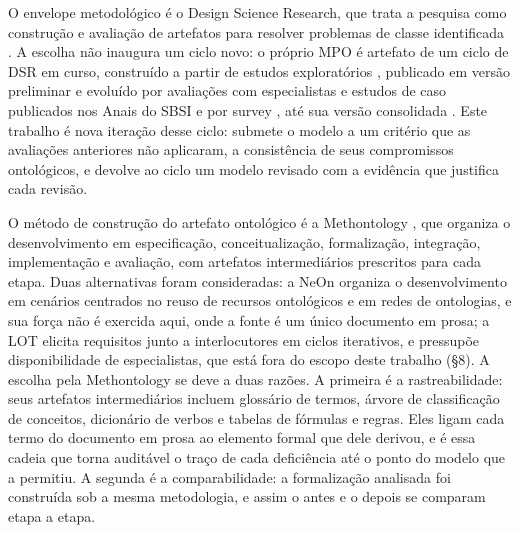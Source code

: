 O envelope metodológico é o Design Science Research, que trata a pesquisa como construção e avaliação de artefatos para resolver problemas de classe identificada \cite{hevner2004design,peffers2007design}. A escolha não inaugura um ciclo novo: o próprio MPO é artefato de um ciclo de DSR em curso, construído a partir de estudos exploratórios \cite{vieira2020universal}, publicado em versão preliminar \cite{vieira2021model} e evoluído por avaliações com especialistas e estudos de caso publicados nos Anais do SBSI \cite{vieira2022evaluating} e por survey \cite{vieira2023survey}, até sua versão consolidada \cite{farias2025conceptual}. Este trabalho é nova iteração desse ciclo: submete o modelo a um critério que as avaliações anteriores não aplicaram, a consistência de seus compromissos ontológicos, e devolve ao ciclo um modelo revisado com a evidência que justifica cada revisão.

O método de construção do artefato ontológico é a Methontology \cite{fernandez1997methontology}, que organiza o desenvolvimento em especificação, conceitualização, formalização, integração, implementação e avaliação, com artefatos intermediários prescritos para cada etapa. Duas alternativas foram consideradas: a NeOn \cite{suarez2012neon} organiza o desenvolvimento em cenários centrados no reuso de recursos ontológicos e em redes de ontologias, e sua força não é exercida aqui, onde a fonte é um único documento em prosa; a LOT \cite{poveda2022lot} elicita requisitos junto a interlocutores em ciclos iterativos, e pressupõe disponibilidade de especialistas, que está fora do escopo deste trabalho (\S{}8). A escolha pela Methontology se deve a duas razões. A primeira é a rastreabilidade: seus artefatos intermediários incluem glossário de termos, árvore de classificação de conceitos, dicionário de verbos e tabelas de fórmulas e regras. Eles ligam cada termo do documento em prosa ao elemento formal que dele derivou, e é essa cadeia que torna auditável o traço de cada deficiência até o ponto do modelo que a permitiu. A segunda é a comparabilidade: a formalização analisada foi construída sob a mesma metodologia, e assim o antes e o depois se comparam etapa a etapa.


